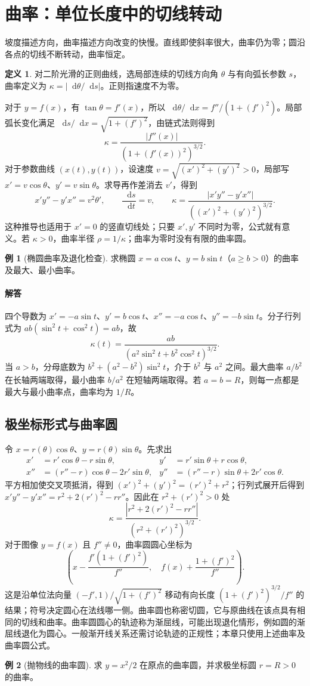 \documentclass[UTF8,fontset=fandol,12pt,oneside,openany]{ctexrep}
\newcommand{\dd}{\mathop{}\!\mathrm d}
\theoremstyle{definition}
\newtheorem{definition}[theorem]{定义}
\newtheorem{example}{例}[chapter]
\begin{document}
\section{曲率：单位长度中的切线转动}
\label{lec:09:curvature}
坡度描述方向，曲率描述方向改变的快慢。直线即使斜率很大，曲率仍为零；圆沿各点的切线不断转动，曲率恒定。
\begin{definition}
对二阶光滑的正则曲线，选局部连续的切线方向角 $\theta$ 与有向弧长参数 $s$，曲率定义为 $\kappa=|\dd\theta/\dd s|$。正则指速度不为零。
\end{definition}
对于 $y=f(x)$，有 $\tan\theta=f'(x)$，所以 $\dd\theta/\dd x=f''/(1+(f')^2)$。局部弧长变化满足 $\dd s/\dd x=\sqrt{1+(f')^2}$，由链式法则得到
\[\kappa=\frac{|f''(x)|}{(1+(f'(x))^2)^{3/2}}.\]
对于参数曲线 $(x(t),y(t))$，设速度 $v=\sqrt{(x')^2+(y')^2}>0$，局部写 $x'=v\cos\theta$、$y'=v\sin\theta$。求导再作差消去 $v'$，得到
\[x'y''-y'x''=v^2\theta',\qquad \frac{\dd s}{\dd t}=v,\qquad
\kappa=\frac{|x'y''-y'x''|}{((x')^2+(y')^2)^{3/2}}.\]
这种推导也适用于 $x'=0$ 的竖直切线处；只要 $x',y'$ 不同时为零，公式就有意义。若 $\kappa>0$，曲率半径 $\rho=1/\kappa$；曲率为零时没有有限的曲率圆。

\begin{example}[椭圆曲率及退化检查]
求椭圆 $x=a\cos t$、$y=b\sin t$（$a\ge b>0$）的曲率及最大、最小曲率。
\end{example}
\paragraph{解答}四个导数为 $x'=-a\sin t$、$y'=b\cos t$、$x''=-a\cos t$、$y''=-b\sin t$。分子行列式为 $ab(\sin^2t+\cos^2t)=ab$，故
\[\kappa(t)=\frac{ab}{(a^2\sin^2t+b^2\cos^2t)^{3/2}}.\]
当 $a>b$，分母底数为 $b^2+(a^2-b^2)\sin^2t$，介于 $b^2$ 与 $a^2$ 之间。最大曲率 $a/b^2$ 在长轴两端取得，最小曲率 $b/a^2$ 在短轴两端取得。若 $a=b=R$，则每一点都是最大与最小曲率点，曲率均为 $1/R$。

\subsection{极坐标形式与曲率圆}
令 $x=r(\theta)\cos\theta$、$y=r(\theta)\sin\theta$。先求出
\begin{align*}
x'&=r'\cos\theta-r\sin\theta,&y'&=r'\sin\theta+r\cos\theta,\\
x''&=(r''-r)\cos\theta-2r'\sin\theta,&y''&=(r''-r)\sin\theta+2r'\cos\theta.
\end{align*}
平方相加使交叉项抵消，得到 $(x')^2+(y')^2=(r')^2+r^2$；行列式展开后得到 $x'y''-y'x''=r^2+2(r')^2-rr''$。因此在 $r^2+(r')^2>0$ 处
\[\kappa=\frac{|r^2+2(r')^2-rr''|}{(r^2+(r')^2)^{3/2}}.\]
对于图像 $y=f(x)$ 且 $f''\ne0$，曲率圆圆心坐标为
\[\left(x-\frac{f'(1+(f')^2)}{f''},\quad f(x)+\frac{1+(f')^2}{f''}\right).\]
这是沿单位法向量 $(-f',1)/\sqrt{1+(f')^2}$ 移动有向长度 $(1+(f')^2)^{3/2}/f''$ 的结果；符号决定圆心在法线哪一侧。曲率圆也称密切圆，它与原曲线在该点具有相同的切线和曲率。曲率圆圆心的轨迹称为渐屈线，可能出现退化情形，例如圆的渐屈线退化为圆心。一般渐开线关系还需讨论轨迹的正规性；本章只使用上述曲率及曲率圆公式。
\begin{example}[抛物线的曲率圆]
求 $y=x^2/2$ 在原点的曲率圆，并求极坐标圆 $r=R>0$ 的曲率。
\end{example}
\end{document}
